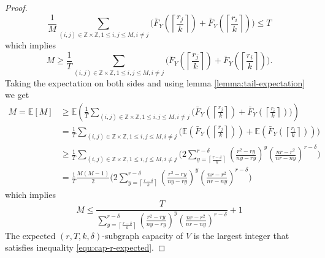 \documentclass[10pt]{extarticle}
\newcommand{\Z}{\mathbb{Z}}
\theoremstyle{definition}
\begin{document}
\begin{proof}
\begin{equation*}
      \frac{1}{M} \sum_{(i,j) \in \Z\times\Z, 1 \le i,j \le M, i \ne j}  \Biggl( \bar{F}_Y\left(\left\lceil \frac{r_j}{k} \right\rceil\right) + \bar{F}_Y\left(\left\lceil \frac{r_i}{k} \right\rceil\right) \Biggr)  \le T 
\end{equation*}
\noindent which implies
\begin{equation}
\label{equ:cap-r}      
       M \geq \frac{1}{T}\sum_{(i,j) \in \Z\times\Z, 1 \le i,j \le M, i \ne j}  \Biggl( \bar{F}_Y\left(\left\lceil \frac{r_j}{k} \right\rceil\right) + \bar{F}_Y\left(\left\lceil \frac{r_i}{k} \right\rceil\right)\Biggr). 
\end{equation}
Taking the expectation on both sides and using lemma \ref{lemma:tail-expectation} we get
\begin{equation}
    \begin{split}
           M = \mathbb{E}[M] &\geq \mathbb{E} \left(\frac{1}{T}\sum_{(i,j) \in \Z\times\Z, 1 \le i,j \le M, i \ne j}  \Biggl( \bar{F}_Y\left(\left\lceil \frac{r_j}{k} \right\rceil\right) + \bar{F}_Y\left(\left\lceil \frac{r_i}{k} \right\rceil\right)\Biggr) \right) \\ &= 
           \frac{1}{T}\sum_{(i,j) \in \Z\times\Z, 1 \le i,j \le M, i \ne j}  \Biggl( \mathbb{E} \left( \bar{F}_Y\left(\left\lceil \frac{r_j}{k} \right\rceil\right) \right) + \mathbb{E} \left( \bar{F}_Y\left(\left\lceil \frac{r_i}{k} \right\rceil\right) \right)\Biggr) \\
           &\ge
           \frac{1}{T}\sum_{(i,j) \in \Z\times\Z, 1 \le i,j \le M, i \ne j}  \Biggl( 2 \sum_{y = \left\lceil \frac{r-\delta}{k} \right\rceil}^{r-\delta}
           \left(\frac{r^2 - ry}{ny-ry}\right)^{y} \left(\frac{nr-r^2}{nr-ny}\right)^{r-\delta}\Biggr) \\
           &=\frac{1}{T} \frac{M(M-1)}{2} \Biggl( 2 \sum_{y = \left\lceil \frac{r-\delta}{k} \right\rceil}^{r-\delta}
           \left(\frac{r^2 - ry}{ny-ry}\right)^{y} \left(\frac{nr-r^2}{nr-ny}\right)^{r-\delta}\Biggr) 
    \end{split}
    \end{equation}
which implies 
\begin{equation}
    \label{equ:cap-r-expected}     
    M \le \frac{T}{\sum_{y = \left\lceil \frac{r-\delta}{k} \right\rceil}^{r-\delta}
    \left(\frac{r^2 - ry}{ny-ry}\right)^{y} \left(\frac{nr-r^2}{nr-ny}\right)^{r-\delta}} + 1
\end{equation}
The expected $(r,T,k,\delta)$-subgraph capacity of $V$ is the largest integer that satisfies inequality \ref{equ:cap-r-expected}.
    
\end{proof}
\end{document}
